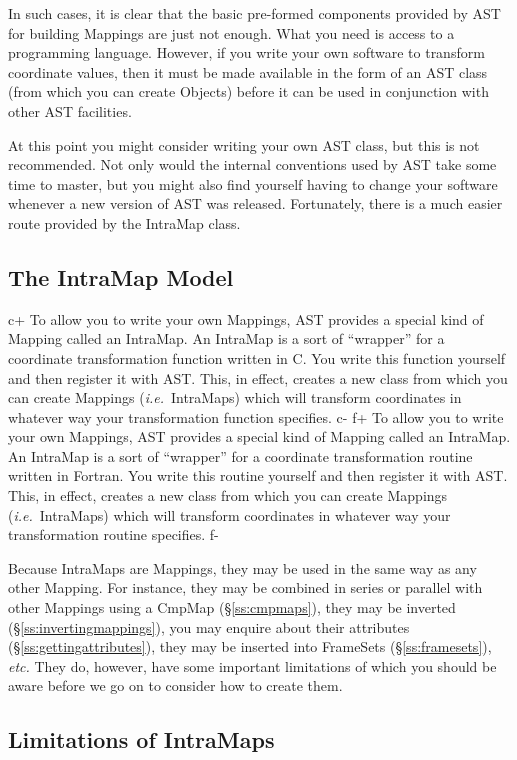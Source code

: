 \documentclass[twoside,11pt]{article}
\newcommand{\secref}[1]{\S\ref{#1}}
\newcommand{\secref}[1]{\ref{#1}}
\begin{document}
In such cases, it is clear that the basic pre-formed components
provided by AST for building Mappings are just not enough. What you
need is access to a programming language. However, if you write your
own software to transform coordinate values, then it must be made
available in the form of an AST class (from which you can create
Objects) before it can be used in conjunction with other AST
facilities.

At this point you might consider writing your own AST class, but this
is not recommended. Not only would the internal conventions used by
AST take some time to master, but you might also find yourself having
to change your software whenever a new version of AST was
released. Fortunately, there is a much easier route provided by the
IntraMap class.

\subsection{The IntraMap Model}

c+
To allow you to write your own Mappings, AST provides a special kind
of Mapping called an IntraMap. An IntraMap is a sort of ``wrapper''
for a coordinate transformation function written in C. You write this
function yourself and then register it with AST. This, in effect,
creates a new class from which you can create Mappings
({\em{i.e.}}\ IntraMaps) which will transform coordinates in whatever
way your transformation function specifies.
c-
f+
To allow you to write your own Mappings, AST provides a special kind
of Mapping called an IntraMap. An IntraMap is a sort of ``wrapper''
for a coordinate transformation routine written in Fortran. You write
this routine yourself and then register it with AST. This, in effect,
creates a new class from which you can create Mappings
({\em{i.e.}}\ IntraMaps) which will transform coordinates in whatever
way your transformation routine specifies.
f-

Because IntraMaps are Mappings, they may be used in the same way as
any other Mapping. For instance, they may be combined in series or
parallel with other Mappings using a CmpMap (\secref{ss:cmpmaps}),
they may be inverted (\secref{ss:invertingmappings}), you may enquire
about their attributes (\secref{ss:gettingattributes}), they may be
inserted into FrameSets (\secref{ss:framesets}), {\em{etc.}} They do,
however, have some important limitations of which you should be aware
before we go on to consider how to create them.

\subsection{\label{ss:intramaplimitations}Limitations of IntraMaps}
\end{document}
